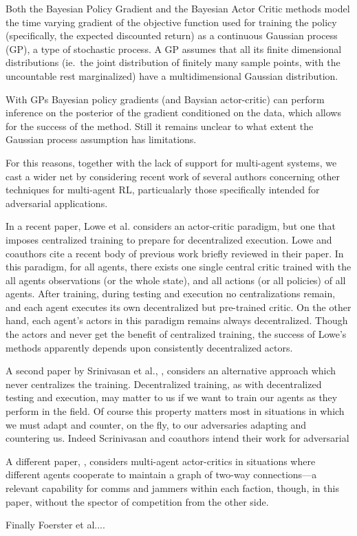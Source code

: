 \documentclass{article}
\begin{document}
Both the Bayesian Policy Gradient and the Bayesian Actor Critic
methods model the time varying gradient of the objective function used
for training the policy (specifically, the expected discounted return)
as a continuous Gaussian process (GP), a type of stochastic process.
A GP assumes that all its finite dimensional distributions (ie.\ the
joint distribution of finitely many sample points, with the
uncountable rest marginalized) have a multidimensional Gaussian
distribution.

With GPs Bayesian policy gradients (and Baysian actor-critic) can
perform inference on the posterior of the gradient conditioned on the
data, which allows for the success of the method.  Still it remains
unclear to what extent the Gaussian process assumption has
limitations.

For this reasons, together with the lack of support for multi-agent
systems, we cast a wider net by considering recent work of several
authors concerning other techniques for multi-agent RL, particualarly
those specifically intended for adversarial applications.

In a recent paper, Lowe et al. \cite{lowe2017multi} considers an
actor-critic paradigm, but one that imposes centralized training to
prepare for decentralized execution.  Lowe and coauthors cite a recent
body of previous work briefly reviewed in their paper.  In this
paradigm, for all agents, there exists one single central critic
trained with the all agents observations (or the whole state), and all
actions (or all policies) of all agents.  After training, during
testing and execution no centralizations remain, and each agent
executes its own decentralized but pre-trained critic.  On the other
hand, each agent's actors in this paradigm remains always
decentralized.  Though the actors and never get the benefit of
centralized training, the success of Lowe's methods apparently depends
upon consistently decentralized actors.

A second paper by Srinivasan et al., \cite{srinivasan2018actor},
considers an alternative approach which never centralizes the
training.  Decentralized training, as with decentralized testing and
execution, may matter to us if we want to train our agents as they
perform in the field.  Of course this property matters most in
situations in which we must adapt and counter, on the fly, to our
adversaries adapting and countering us.  Indeed Scrinivasan and
coauthors intend their work for adversarial

A different paper, \cite{su2020counterfactual}, considers multi-agent
actor-critics in situations where different agents cooperate to
maintain a graph of two-way connections---a relevant capability for
comms and jammers within each faction, though, in this paper, without
the spector of competition from the other side.

Finally Foerster et al....


% 

\end{document}
